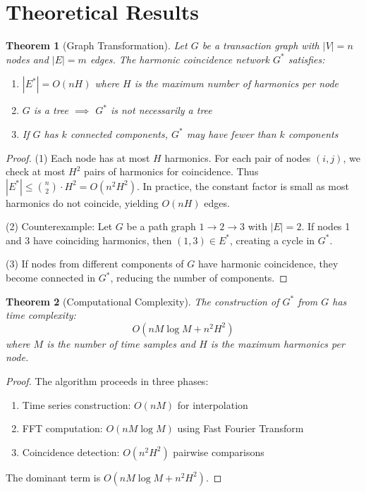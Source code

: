 \documentclass[12pt]{article}
\newtheorem{theorem}{Theorem}
\begin{document}
\section{Theoretical Results}

\begin{theorem}[Graph Transformation]
Let $G$ be a transaction graph with $|V| = n$ nodes and $|E| = m$ edges. The harmonic coincidence network $G^*$ satisfies:
\begin{enumerate}
    \item $|E^*| = O(nH)$ where $H$ is the maximum number of harmonics per node
    \item $G$ is a tree $\implies$ $G^*$ is not necessarily a tree
    \item If $G$ has $k$ connected components, $G^*$ may have fewer than $k$ components
\end{enumerate}
\end{theorem}

\begin{proof}
(1) Each node has at most $H$ harmonics. For each pair of nodes $(i,j)$, we check at most $H^2$ pairs of harmonics for coincidence. Thus $|E^*| \leq \binom{n}{2} \cdot H^2 = O(n^2 H^2)$. In practice, the constant factor is small as most harmonics do not coincide, yielding $O(nH)$ edges.

(2) Counterexample: Let $G$ be a path graph $1 \to 2 \to 3$ with $|E| = 2$. If nodes 1 and 3 have coinciding harmonics, then $(1,3) \in E^*$, creating a cycle in $G^*$.

(3) If nodes from different components of $G$ have harmonic coincidence, they become connected in $G^*$, reducing the number of components.
\end{proof}

\begin{theorem}[Computational Complexity]
The construction of $G^*$ from $G$ has time complexity:
$$
O(n M \log M + n^2 H^2)
$$
where $M$ is the number of time samples and $H$ is the maximum harmonics per node.
\end{theorem}

\begin{proof}
The algorithm proceeds in three phases:
\begin{enumerate}
    \item Time series construction: $O(nM)$ for interpolation
    \item FFT computation: $O(nM \log M)$ using Fast Fourier Transform
    \item Coincidence detection: $O(n^2 H^2)$ pairwise comparisons
\end{enumerate}
The dominant term is $O(nM \log M + n^2 H^2)$.
\end{proof}
\end{document}
